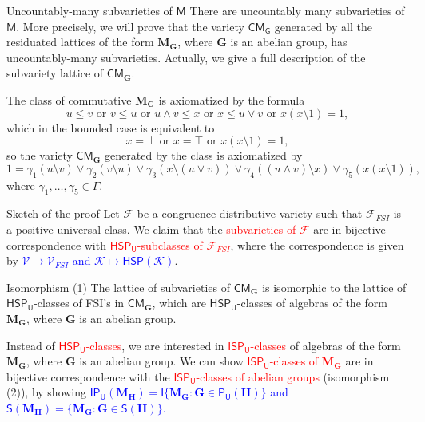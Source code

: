 \documentclass[professionalfont, handout, 10pt]{beamer} %
\theoremstyle{plain}
\theoremstyle{definition}
\newcommand{\m}[1]{{\mathbf {#1} }}
\newcommand{\jn}{\vee}
\newcommand{\mt}{\wedge}
\newcommand{\ld}{{\setminus}}
\begin{document}
\begin{frame}{Uncountably-many subvarieties of $\mathsf{M}$}
There are uncountably many subvarieties of $\mathsf{M}$. \pause
More precisely, we will prove that the variety $\mathsf{CM_G}$ generated by all the residuated lattices of the form $\mathbf{M}_{\mathbf{G}}$, where $\mathbf{G}$ is an abelian group, has uncountably-many subvarieties.
Actually, we give a full description of the subvariety lattice of $\mathsf{CM}_{\mathbf{G}}$.
\pause

The class of commutative $\m M_{\m G}$ is axiomatized by the formula
$$u \leq v \text{ or } v \leq u \text{ or } u \mt v \leq x \text{ or } x \leq u \jn v \text{ or } x(x\ld 1) = 1,$$
which in the bounded case is equivalent to
$$x = \bot \text{ or } x = \top \text{ or } x(x\ld 1) = 1,$$
so the variety $\mathsf{CM}_{\m G}$ generated by the class is axiomatized by $$1 = \gamma_1(u \ld v) \jn \gamma_2(v \ld u) \jn \gamma_3(x \ld (u \jn v)) \jn \gamma_4((u \mt v) \ld x) \jn \gamma_5(x(x\ld 1)),$$
where $\gamma_1, \ldots, \gamma_5 \in \Gamma$.
\end{frame}

\begin{frame}{Sketch of the proof}
    Let $\mathcal{F}$ be a congruence-distributive variety such that $\mathcal{F}_{FSI}$ is a positive universal class.
    We claim that the \textcolor{red}{subvarieties of $\mathcal{F}$} are in bijective correspondence with \textcolor{red}{$\mathsf{HSP_U}$-subclasses of $\mathcal{F}_{FSI}$}, where the correspondence is given by 
    \textcolor{blue}{$\mathcal{V} \mapsto \mathcal{V}_{FSI}$ and $\mathcal{K} \mapsto \mathsf{HSP}(\mathcal{K})$}.\pause
    \begin{block}{Isomorphism (1)}
        The lattice of subvarieties of $\mathsf{CM}_{\mathbf{G}}$ is isomorphic to the lattice of  $\mathsf{HSP_U}$-classes of FSI's in $\mathsf{CM}_{\mathbf{G}}$, which are $\mathsf{HSP_U}$-classes of algebras of the form $\m{M}_{\m{G}}$, where $\m{G}$ is an abelian group.
    \end{block}
    \pause
    Instead of \textcolor{red}{$\mathsf{HSP_U}$-classes}, we are interested in \textcolor{red}{$\mathsf{ISP_U}$-classes} of algebras of the form $\m{M}_{\m{G}}$, where $\m{G}$ is an abelian group.\pause
    We can show \textcolor{red}{$\mathsf{ISP_U}$-classes of $\m M_{\m G}$} are in bijective correspondence with the \textcolor{red}{$\mathsf{ISP_U}$-classes of abelian groups} (isomorphism (2)), by showing \textcolor{blue}{$\mathsf{IP_U}(\m{M}_{\m{H}})=\mathsf{I}\{\m{M}_{\m{G}}: \m{G} \in \mathsf{P_U}(\m{H})\}$ and $\mathsf{S}(\m{M}_{\m{H}})=\{\m{M}_{\m{G}}:  \m{G} \in \mathsf{S}(\m{H})\}$.}
\end{frame}
\end{document}

